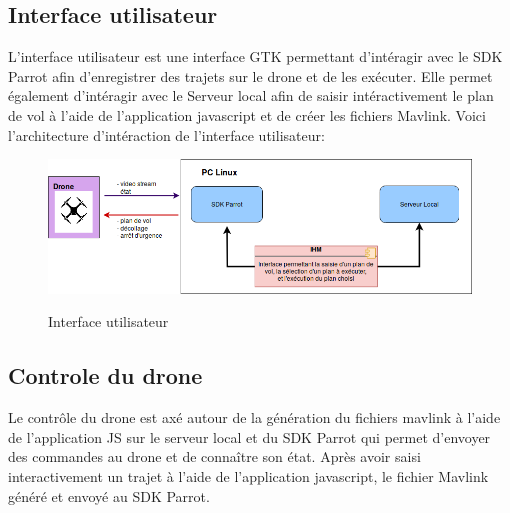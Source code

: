 \documentclass{article}
\begin{document}
    \subsection{Interface utilisateur}
    L'interface utilisateur est une interface GTK permettant d'intéragir avec le SDK Parrot afin d'enregistrer des trajets sur le drone et de les exécuter.
    \newline
    Elle permet également d'intéragir avec le Serveur local afin de saisir intéractivement le plan de vol à l'aide de l'application javascript et de créer les fichiers Mavlink.
    \vspace{0.2cm}
    \newline
    Voici l'architecture d'intéraction de l'interface utilisateur:
        \vspace*{0.5cm}
        \begin{center}
		\begin{figure}[!h]
		\includegraphics[scale=0.5]{new_HIM.png}\\
		 \vspace*{0.3cm}
		\caption{Interface utilisateur}
		\end{figure}
        \end{center}

\newpage
        
	 \subsection{Controle du drone}
	 Le contrôle du drone est axé autour de la génération du fichiers mavlink à l'aide de l'application JS sur le serveur local et du SDK Parrot qui permet d'envoyer des commandes au drone et de connaître son état.
	 \newline
	 Après avoir saisi interactivement un trajet à l'aide de l'application javascript, le fichier Mavlink généré et envoyé au SDK Parrot. 
	 \vspace{0.1cm}
	 \newline
	 
\end{document}
